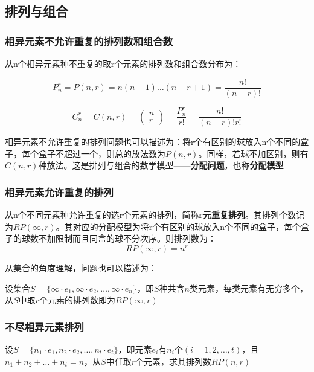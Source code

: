\documentclass{article}
\begin{document}
\subsection{排列与组合}

\subsubsection{相异元素不允许重复的排列数和组合数}

从n个相异元素种不重复的取r个元素的排列数和组合数分布为：

\begin{equation}
    P^r_n=P(n,r) = n(n-1)\dots(n-r+1) = \frac{n!}{(n-r)!}
\end{equation}

\begin{equation}
    C^r_n = C(n,r) = \begin{pmatrix}
        n \\ r
    \end{pmatrix} = \frac{P^r_n}{r!} = \frac{n!}{(n-r)!r!}
\end{equation}

相异元素不允许重复的排列问题也可以描述为：将r个有区别的球放入n个不同的盒子，每个盒子不超过一个，则总的放法数为$P(n,r)$。同样，若球不加区别，则有$C(n,r)$种放法。这是排列与组合的数学模型——\textbf{分配问题}，也称\textbf{分配模型}


\subsubsection{相异元素允许重复的排列}

从n个不同元素种允许重复的选r个元素的排列，简称\textbf{r元重复排列}。其排列个数记为$RP(\infty,r)$。其对应的分配模型为将r个有区别的球放入n个不同的盒子，每个盒子的球数不加限制而且同盒的球不分次序。则排列数为：
\begin{equation}
    RP(\infty,r) = n^r
\end{equation}

从集合的角度理解，问题也可以描述为：

设集合$S= \{\infty \cdot e_1,\infty \cdot e_2,\dots,\infty \cdot e_n \}$，即$S$种共含$n$类元素，每类元素有无穷多个，从$S$中取$r$个元素的排列数即为$RP(\infty,r)$

\subsubsection{不尽相异元素排列}

设$S=\{n_1\cdot e_1,n_2\cdot e_2,\dots,n_t\cdot e_t\}$，即元素$e_i$有$n_i$个$(i=1,2,\dots,t)$，且$n_1+n_2+\dots+n_t = n$，从$S$中任取$r$个元素，求其排列数$RP(n,r)$
\end{document}
